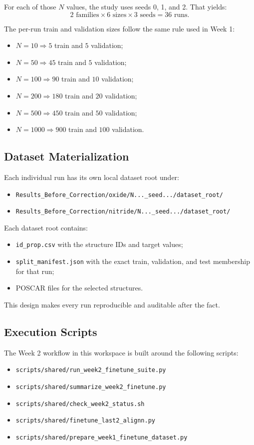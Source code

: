 \documentclass[11pt]{article}
\begin{document}
For each of those $N$ values, the study uses seeds 0, 1, and 2.
That yields:
\[
2 \text{ families} \times 6 \text{ sizes} \times 3 \text{ seeds} = 36 \text{ runs}.
\]

The per-run train and validation sizes follow the same rule used in Week 1:
\begin{itemize}
  \item $N=10 \Rightarrow 5$ train and $5$ validation;
  \item $N=50 \Rightarrow 45$ train and $5$ validation;
  \item $N=100 \Rightarrow 90$ train and $10$ validation;
  \item $N=200 \Rightarrow 180$ train and $20$ validation;
  \item $N=500 \Rightarrow 450$ train and $50$ validation;
  \item $N=1000 \Rightarrow 900$ train and $100$ validation.
\end{itemize}

\subsection{Dataset Materialization}
Each individual run has its own local dataset root under:
\begin{itemize}
  \item \texttt{Results_Before_Correction/oxide/N...\_seed.../dataset\_root/}
  \item \texttt{Results_Before_Correction/nitride/N...\_seed.../dataset\_root/}
\end{itemize}

Each dataset root contains:
\begin{itemize}
  \item \texttt{id\_prop.csv} with the structure IDs and target values;
  \item \texttt{split\_manifest.json} with the exact train, validation, and test membership for that run;
  \item POSCAR files for the selected structures.
\end{itemize}

This design makes every run reproducible and auditable after the fact.

\subsection{Execution Scripts}
The Week 2 workflow in this workspace is built around the following scripts:
\begin{itemize}
  \item \texttt{scripts/shared/run\_week2\_finetune\_suite.py}
  \item \texttt{scripts/shared/summarize\_week2\_finetune.py}
  \item \texttt{scripts/shared/check\_week2\_status.sh}
  \item \texttt{scripts/shared/finetune\_last2\_alignn.py}
  \item \texttt{scripts/shared/prepare\_week1\_finetune\_dataset.py}
\end{itemize}
\end{document}

